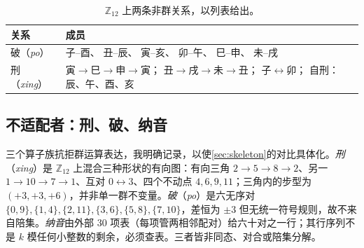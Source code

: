 \documentclass[11pt,a4paper,fontset=none]{ctexart}
\theoremstyle{definition}
\theoremstyle{remark}
\newcommand{\Z}{\mathbb{Z}}
\begin{document}
\begin{table}[h]\centering
\caption{五条群运算关系的逐支伙伴。三合给陪集（含化神）；三会给连续三元组（含方位）。\label{tab:branchtable}}
\end{table}

\begin{table}[h]\centering
\caption{$\Z_{12}$ 上两条非群关系，以列表给出。\label{tab:branchlookup}}
\small
\begin{tabular}{l|l}
\toprule
关系 & 成员\\
\midrule
破（\emph{po}） & 子--酉、\; 丑--辰、\; 寅--亥、\; 卯--午、\; 巳--申、\; 未--戌\\
刑（\emph{xing}） & 寅$\to$巳$\to$申$\to$寅；\; 丑$\to$戌$\to$未$\to$丑；\; 子$\leftrightarrow$卯；\; 自刑：辰、午、酉、亥\\
\bottomrule
\end{tabular}
\end{table}

\subsection{不适配者：刑、破、纳音}\label{sec:nonfit}
三个算子族抗拒群运算表达，我明确记录，以使\cref{sec:skeleton}的对比具体化。\emph{刑}（\emph{xing}）是 $\Z_{12}$ 上混合三种形状的有向图：有向三角 $2\to5\to8\to2$、另一 $1\to10\to7\to1$、互对 $0\leftrightarrow3$、四个不动点 $4,6,9,11$；三角内的步型为 $(+3,+3,+6)$，并非单一群不变量。\emph{破}（\emph{po}）是六无序对 $\{0,9\},\{1,4\},\{2,11\},\{3,6\},\{5,8\},\{7,10\}$，差恒为 $\pm3$ 但无统一符号规则，故不来自陪集。\emph{纳音}由外部 $30$ 项表（每项管两相邻配对）给六十对之一行；其行序列不是 $k$ 模任何小整数的剩余，必须查表。三者皆非同态、对合或陪集分解。
\end{document}
